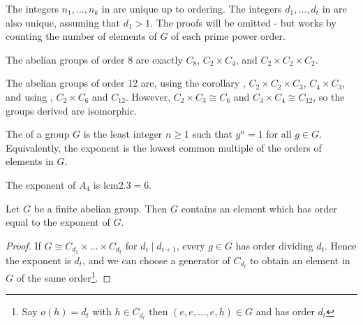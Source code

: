 \begin{remark}
	The integers $n_1, \dots, n_k$ in  are unique up to ordering.
	The integers $d_1, \dots, d_t$ in  are also unique, assuming that $d_1 > 1$.
	The proofs will be omitted - but works by counting the number of elements of $G$ of each prime power order.
\end{remark}

\begin{example}
	The abelian groups of order 8 are exactly $C_8$, $C_2 \times C_4$, and $C_2 \times C_2 \times C_2$.
\end{example}

\begin{example}
	The abelian groups of order 12 are, using the corollary , $C_2 \times C_2 \times C_3$, $C_4 \times C_3$, and using , $C_2 \times C_6$ and $C_{12}$.
	However, $C_2 \times C_3 \cong C_6$ and $C_3 \times C_4 \cong C_{12}$, so the groups derived are isomorphic.
\end{example} 

\begin{definition}[Exponent]
	The  of a group $G$ is the least integer $n \geq 1$ such that $g^n = 1$ for all $g \in G$.
	Equivalently, the exponent is the lowest common multiple of the orders of elements in $G$.
\end{definition}

\begin{example}
	The exponent of $A_4$ is $\mathrm{lcm}\qty{2, 3} = 6$.
\end{example}

\begin{corollary}
	Let $G$ be a finite abelian group.
	Then $G$ contains an element which has order equal to the exponent of $G$.
\end{corollary}

\begin{proof}
	If $G \cong C_{d_1} \times \dots \times C_{d_t}$ for $d_i \mid d_{i+1}$, every $g \in G$ has order dividing $d_t$.
	Hence the exponent is $d_t$, and we can choose a generator of $C_{d_t}$ to obtain an element in $G$ of the same order\footnote{Say $o(h) = d_t$ with $h \in C_{d_t}$ then $(e, e, \dots, e, h) \in G$ and has order $d_t$}.
\end{proof}
